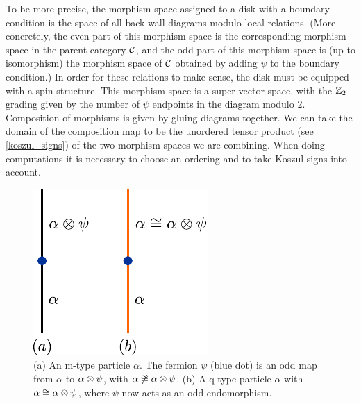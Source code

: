 
To be more precise, the morphism space assigned to a disk with a boundary condition is the space of all back wall diagrams
modulo local relations.
(More concretely, the even part of this morphism space is the corresponding morphism space in the parent category $\mathcal{C}$,
and the odd part of this morphism space is (up to isomorphism) the morphism space of $\mathcal{C}$ 
obtained by adding $\psi$ to the boundary condition.)
In order for these relations to make sense, the disk must be equipped with a spin structure.
This morphism space is a super vector space, with the $\mathbb{Z}_2$-grading given by the number of $\psi$ endpoints in the diagram modulo 2.
Composition of morphisms is given by gluing diagrams together.
We can take the domain of the composition map to be the unordered tensor product (see \ref{koszul_signs})
of the two morphism spaces we are combining.
When doing computations it is necessary to choose an ordering and to take Koszul signs into account.


\medskip

\begin{figure}
\begin{center}
\includegraphics{mvsqtypeprime.pdf}
\caption{ \label{mvsqtype} (a) An m-type particle $\alpha$. The fermion $\psi$ (blue dot) is 
an odd map from $\alpha$ to $\alpha\otimes \psi$, with $\alpha\not\cong\alpha\otimes\psi$. (b) A q-type particle $\alpha$ with $\alpha\cong\alpha\otimes\psi$, where $\psi$ now acts as an odd 
endomorphism.
}
\end{center}
\end{figure} 

